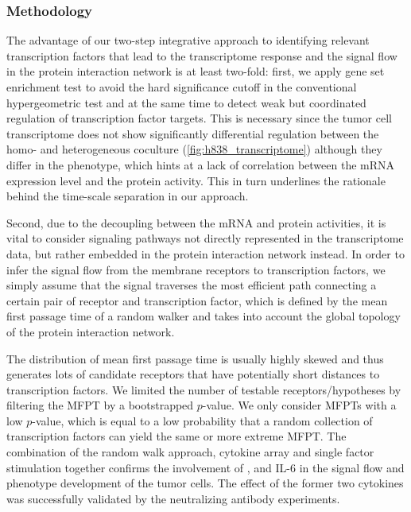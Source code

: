 \subsubsection{Methodology}

The advantage of our two-step integrative approach to identifying 
relevant transcription factors that lead to the transcriptome response
and the signal flow in the protein interaction network 
is at least two-fold: first, we apply gene set enrichment test to avoid the hard 
significance cutoff in the conventional hypergeometric test and at the same time
to detect weak but coordinated regulation of transcription factor targets. This is 
necessary since the tumor cell transcriptome does not show significantly
differential regulation between the homo- and heterogeneous coculture 
(\ref{fig:h838_transcriptome}) although they differ in the phenotype, which 
hints at a lack of correlation between the mRNA expression level and the protein 
activity. This in turn underlines the rationale behind the time-scale separation
in our approach. 

Second, due to the decoupling between the mRNA and protein
activities, it is vital to consider signaling pathways not directly represented
in the transcriptome data, but rather embedded in the protein interaction network
instead. In order to infer the signal flow from the membrane receptors to 
transcription factors, we simply assume that the signal traverses the most efficient
path connecting a certain pair of receptor and transcription factor, which is 
defined by the mean first passage time of a random walker and takes into account
the global topology of the protein interaction network.

The distribution of mean first passage time is usually
highly skewed and thus generates lots of candidate
receptors that have potentially short distances to
transcription factors. We limited the number of testable
receptors/hypotheses by filtering the MFPT by a bootstrapped
$p$-value. We only consider MFPTs with a low $p$-value,
which is equal to a low
probability that a random collection of transcription 
factors can yield the same or more extreme MFPT.
The combination of the random walk approach, cytokine array and single factor
stimulation together confirms the involvement of \tnfa, 
\sdfonea and 
IL-6 in the
signal flow and phenotype development of the tumor cells. 
The effect of the former two cytokines was successfully 
validated by the 
neutralizing antibody experiments.

